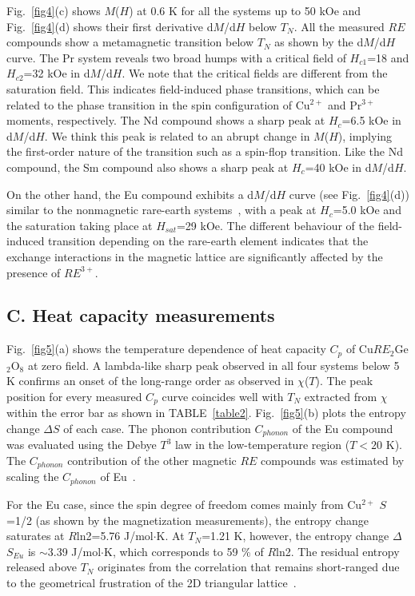 \documentclass[aps,prl,reprint,amsmath,amssymb,superscriptaddress,showpacs]{revtex4-1}
\begin{document}
Fig.~\ref{fig4}(c) shows $M$($H$) at 0.6 K for all the systems up to 50 kOe and Fig.~\ref{fig4}(d) shows their first derivative d$M$/d$H$ below $T_N$. All the measured $RE$ compounds show a metamagnetic transition below $T_N$ as shown by the d$M$/d$H$ curve. The Pr system reveals two broad humps with a critical field of $H_{c1}$=18 and $H_{c2}$=32 kOe in d$M$/d$H$. We note that the critical fields are different from the saturation field. This indicates field-induced phase transitions, which can be related to the phase transition in the spin configuration of Cu$^{2+}$ and Pr$^{3+}$ moments, respectively. The Nd compound shows a sharp peak at $H_c$=6.5 kOe in d$M$/d$H$. We think this peak is related to an abrupt change in $M$($H$), implying the first-order nature of the transition such as a spin-flop transition. Like the Nd compound, the Sm compound also shows a sharp peak at $H_c$=40 kOe in d$M$/d$H$.

On the other hand, the Eu compound exhibits a d$M$/d$H$ curve (see Fig.~\ref{fig4}(d)) similar to the nonmagnetic rare-earth systems~\cite{H.Cho2017}, with a peak at $H_c$=5.0 kOe and the saturation taking place at $H_{sat}$=29 kOe. The different behaviour of the field-induced transition depending on the rare-earth element indicates that the exchange interactions in the magnetic lattice are significantly affected by the presence of $RE^{3+}$.

\subsection{C. Heat capacity measurements}

Fig.~\ref{fig5}(a) shows the temperature dependence of heat capacity $C_p$ of Cu$RE_2$Ge$_2$O$_8$ at zero field. A lambda-like sharp peak observed in all four systems below 5 K confirms an onset of the long-range order as observed in $\chi$($T$). The peak position for every measured $C_p$ curve coincides well with $T_N$ extracted from $\chi$ within the error bar as shown in TABLE~\ref{table2}. Fig.~\ref{fig5}(b) plots the entropy change $\Delta$$S$ of each case. The phonon contribution $C_{phonon}$ of the Eu compound was evaluated using the Debye $T^3$ law in the low-temperature region ($T<20$ K). The $C_{phonon}$ contribution of the other magnetic $RE$ compounds was estimated by scaling the $C_{phonon}$ of Eu~\cite{V.Goruganti2008}. 

For the Eu case, since the spin degree of freedom comes mainly from Cu$^{2+}$ $S$=1/2 (as shown by the magnetization measurements), the entropy change saturates at $R$ln2=5.76 J/mol$\cdot$K. At $T_N$=1.21 K, however, the entropy change $\Delta$$S_{Eu}$ is $\sim$3.39 J/mol$\cdot$K, which corresponds to 59 \% of $R$ln2. The residual entropy released above $T_N$ originates from the correlation that remains short-ranged due to the geometrical frustration of the 2D triangular lattice~\cite{K.Yokota2014,J.Park2010}. 
\end{document}
